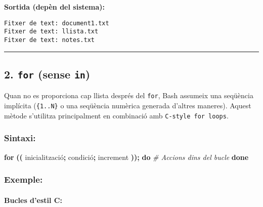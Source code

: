 \documentclass[
  12 pt,
  a4paper,
]{article}
\newenvironment{Shaded}{\begin{snugshade}}{\end{snugshade}}
\newcommand{\BuiltInTok}[1]{#1}
\newcommand{\CommentTok}[1]{\textcolor[rgb]{0.56,0.35,0.01}{\textit{#1}}}
\newcommand{\ControlFlowTok}[1]{\textcolor[rgb]{0.13,0.29,0.53}{\textbf{#1}}}
\newcommand{\DecValTok}[1]{\textcolor[rgb]{0.00,0.00,0.81}{#1}}
\newcommand{\KeywordTok}[1]{\textcolor[rgb]{0.13,0.29,0.53}{\textbf{#1}}}
\newcommand{\NormalTok}[1]{#1}
\newcommand{\OperatorTok}[1]{\textcolor[rgb]{0.81,0.36,0.00}{\textbf{#1}}}
\newcommand{\StringTok}[1]{\textcolor[rgb]{0.31,0.60,0.02}{#1}}
\newcommand{\VariableTok}[1]{\textcolor[rgb]{0.00,0.00,0.00}{#1}}
\begin{document}
\textbf{Sortida (depèn del sistema):}

\begin{verbatim}
Fitxer de text: document1.txt
Fitxer de text: llista.txt
Fitxer de text: notes.txt
\end{verbatim}

\begin{center}\rule{0.5\linewidth}{0.5pt}\end{center}

\subsection{\texorpdfstring{\textbf{2. \texttt{for} (sense
\texttt{in})}}{2. for (sense in)}}\label{for-sense-in}

Quan no es proporciona cap llista després del \texttt{for}, Bash
assumeix una seqüència implícita (\texttt{\{1..N\}} o una seqüència
numèrica generada d'altres maneres). Aquest mètode s'utilitza
principalment en combinació amb \texttt{C-style\ for\ loops}.

\subsubsection{\texorpdfstring{\textbf{Sintaxi}:}{Sintaxi:}}\label{sintaxi-1}

\begin{Shaded}
\begin{Highlighting}[]
\ControlFlowTok{for} \KeywordTok{((} \VariableTok{inicialitzaci}\NormalTok{ó}\KeywordTok{;} \VariableTok{condici}\NormalTok{ó}\KeywordTok{;} \VariableTok{increment} \KeywordTok{));} \ControlFlowTok{do}
    \CommentTok{\# Accions dins del bucle}
\ControlFlowTok{done}
\end{Highlighting}
\end{Shaded}

\subsubsection{\texorpdfstring{\textbf{Exemple}:}{Exemple:}}\label{exemple}

\paragraph{Bucles d'estil C:}\label{bucles-destil-c}

\begin{Shaded}
\end{Shaded}
\end{document}
